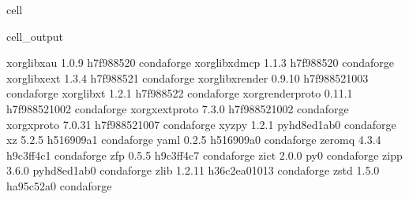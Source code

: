 \documentclass[letterpaper,table,10pt,english]{jupyterBook}
\begin{document}
\begin{sphinxuseclass}{cell}
\begin{sphinxVerbatimOutput}
\begin{sphinxuseclass}{cell_output}
\begin{sphinxVerbatim}[commandchars=\\\{\}]
xorg\PYGZhy{}libxau               1.0.9                h7f98852\PYGZus{}0    conda\PYGZhy{}forge
xorg\PYGZhy{}libxdmcp             1.1.3                h7f98852\PYGZus{}0    conda\PYGZhy{}forge
xorg\PYGZhy{}libxext              1.3.4                h7f98852\PYGZus{}1    conda\PYGZhy{}forge
xorg\PYGZhy{}libxrender           0.9.10            h7f98852\PYGZus{}1003    conda\PYGZhy{}forge
xorg\PYGZhy{}libxt                1.2.1                h7f98852\PYGZus{}2    conda\PYGZhy{}forge
xorg\PYGZhy{}renderproto          0.11.1            h7f98852\PYGZus{}1002    conda\PYGZhy{}forge
xorg\PYGZhy{}xextproto            7.3.0             h7f98852\PYGZus{}1002    conda\PYGZhy{}forge
xorg\PYGZhy{}xproto               7.0.31            h7f98852\PYGZus{}1007    conda\PYGZhy{}forge
xyzpy                     1.2.1              pyhd8ed1ab\PYGZus{}0    conda\PYGZhy{}forge
xz                        5.2.5                h516909a\PYGZus{}1    conda\PYGZhy{}forge
yaml                      0.2.5                h516909a\PYGZus{}0    conda\PYGZhy{}forge
zeromq                    4.3.4                h9c3ff4c\PYGZus{}1    conda\PYGZhy{}forge
zfp                       0.5.5                h9c3ff4c\PYGZus{}7    conda\PYGZhy{}forge
zict                      2.0.0                      py\PYGZus{}0    conda\PYGZhy{}forge
zipp                      3.6.0              pyhd8ed1ab\PYGZus{}0    conda\PYGZhy{}forge
zlib                      1.2.11            h36c2ea0\PYGZus{}1013    conda\PYGZhy{}forge
zstd                      1.5.0                ha95c52a\PYGZus{}0    conda\PYGZhy{}forge
\end{sphinxVerbatim}

\end{sphinxuseclass}\end{sphinxVerbatimOutput}

\end{sphinxuseclass}
\end{document}
